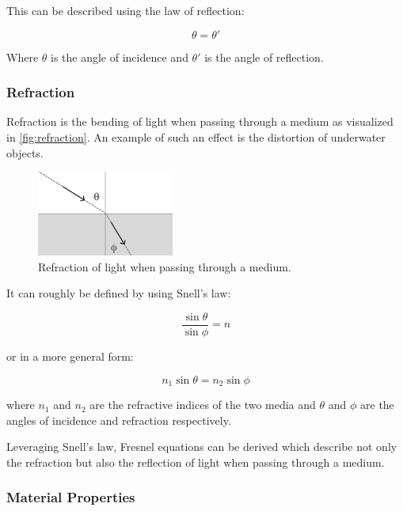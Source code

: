 This can be described using the law of reflection:

\begin{equation}
  \label{eqn:law-of-reflection}
  \theta = \theta'
\end{equation}

Where $\theta$ is the angle of incidence and $\theta'$ is the angle of reflection.

\subsubsection{Refraction}

Refraction is the bending of light when passing through a medium as visualized in \autoref{fig:refraction}. An example of such an effect is the distortion of underwater objects.

\begin{figure}[H]
  \centering
  \includegraphics[width=0.4\textwidth]{resources/refraction.png}
  \caption{Refraction of light when passing through a medium.}
  \label{fig:refraction}
\end{figure}

It can roughly be defined by using Snell's law:

\begin{equation}
  \label{eqn:snells-law}
  \frac{\sin \theta}{\sin \phi} = n
\end{equation}

or in a more general form:

\begin{equation}
  \label{eqn:snells-law-general}
  n_1 \sin \theta = n_2 \sin \phi
\end{equation}

where $n_1$ and $n_2$ are the refractive indices of the two media and $\theta$ and $\phi$ are the angles of incidence and refraction respectively.

Leveraging Snell's law, Fresnel equations can be derived which describe not only the refraction but also the reflection of light when passing through a medium.

\subsubsection{Material Properties}

